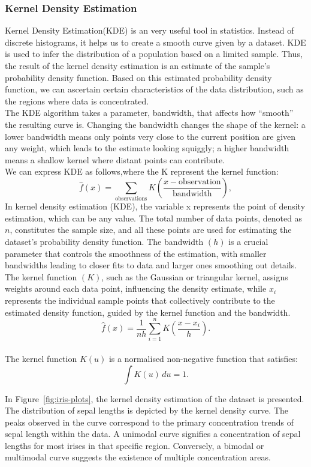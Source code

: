 \documentclass{article}\usepackage[]{graphicx}\usepackage[]{xcolor}
\begin{document}
\subsubsection{Kernel Density Estimation}

Kernel Density Estimation(KDE) is an very useful tool in statistics. Instead of discrete histograms, it helps us to create a smooth curve given by a dataset. KDE is used to infer the distribution of a population based on a limited sample. Thus, the result of the kernel density estimation is an estimate of the sample's probability density function. Based on this estimated probability density function, we can ascertain certain characteristics of the data distribution, such as the regions where data is concentrated.\\

\noindent
The KDE algorithm takes a parameter, bandwidth, that affects how “smooth” the resulting curve is. Changing the bandwidth changes the shape of the kernel: a lower bandwidth means only points very close to the current position are given any weight, which leads to the estimate looking squiggly; a higher bandwidth means a shallow kernel where distant points can contribute.\\

\noindent
We can express KDE as follows,where the K represent the kernel function:
$$\hat{f}(x) = \sum_{\text{observations}} K\left(\frac{x - \text{observation}}{\text{bandwidth}}\right),$$
In kernel density estimation (KDE), the variable x represents the point of density estimation, which can be any value. The total number of data points, denoted as $n$, constitutes the sample size, and all these points are used for estimating the dataset's probability density function. The bandwidth $(h)$ is a crucial parameter that controls the smoothness of the estimation, with smaller bandwidths leading to closer fits to data and larger ones smoothing out details. The kernel function $(K)$, such as the Gaussian or triangular kernel, assigns weights around each data point, influencing the density estimate, while $x_i$ represents the individual sample points that collectively contribute to the estimated density function, guided by the kernel function and the bandwidth\cite{wand1994kernel}.
$$\hat{f}(x) = \frac{1}{nh} \sum_{i=1}^{n} K\left(\frac{x - x_i}{h}\right).$$\\
The kernel function \( K(u) \) is a normalised non-negative function that satisfies:
\[ \int K(u) \, du = 1. \]

\noindent In Figure~\ref{fig:iris-plots}, the kernel density estimation of the dataset is presented. The distribution of sepal lengths is depicted by the kernel density curve. The peaks observed in the curve correspond to the primary concentration trends of sepal length within the data. A unimodal curve signifies a concentration of sepal lengths for most irises in that specific region. Conversely, a bimodal or multimodal curve suggests the existence of multiple concentration areas.
\end{document}
